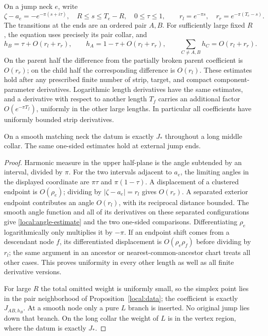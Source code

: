 \begin{lemma}\label{local:neck-coefficients}
On a jump neck $e$, write
\[
 \zeta-a_e=-e^{-\pi(s+i\tau)},\quad
 R\leq s\leq T_e-R,\quad 0\leq\tau\leq1,
 \qquad r_l=e^{-\pi s},\quad r_r=e^{-\pi(T_e-s)}.
\]
The transitions at the ends are an ordered pair $A,B$.  For sufficiently
large fixed $R$, the equation uses precisely its pair collar, and
\begin{equation}\label{local:angle-estimate}
 h_B=\tau+O(r_l+r_r),\qquad
 h_A=1-\tau+O(r_l+r_r),\qquad
 \sum_{C\ne A,B}h_C=O(r_l+r_r).
\end{equation}
On the parent half the difference from the partially broken parent
coefficient is $O(r_r)$; on the child half the corresponding difference
is $O(r_l)$.  These estimates hold after any prescribed finite number of
strip, target, and compact component-parameter derivatives.  Logarithmic
length derivatives have the same estimates, and a derivative with
respect to another length $T_f$ carries an additional factor
$O(e^{-\pi T_f})$, uniformly in the other large lengths.  In particular
all coefficients have uniformly bounded strip derivatives.

On a smooth matching neck the datum is exactly $J_*$ throughout a long
middle collar.  The same one-sided estimates hold at external jump ends.
\end{lemma}
\begin{proof}
Harmonic measure in the upper half-plane is the angle subtended by an
interval, divided by $\pi$.  For the two intervals adjacent to $a_e$,
the limiting angles in the displayed coordinate are $\pi\tau$ and
$\pi(1-\tau)$.  A displacement of a clustered endpoint is $O(\rho_e)$;
dividing by $|\zeta-a_e|=r_l$ gives $O(r_r)$.  A separated exterior
endpoint contributes an angle $O(r_l)$, with its reciprocal distance
bounded.  The smooth angle function and all of its derivatives on these
separated configurations give \eqref{local:angle-estimate} and the two
one-sided comparisons.  Differentiating $\rho_e$ logarithmically only
multiplies it by $-\pi$.  If an endpoint shift comes from a descendant
node $f$, its differentiated displacement is $O(\rho_e\rho_f)$ before
dividing by $r_l$; the same argument in an ancestor or nearest-common-ancestor chart treats all other cases.  This proves uniformity in every
other length as well as all finite derivative versions.

For large $R$ the total omitted weight is uniformly small, so the
simplex point lies in the pair neighborhood of
Proposition~\ref{local:data}; the coefficient is exactly $J_{AB,h_B}$.
At a smooth node only a pure $L$ branch is inserted.  No original jump
lies down that branch.  On the long collar the weight of $L$ is in the
vertex region, where the datum is exactly $J_*$.
\end{proof}

